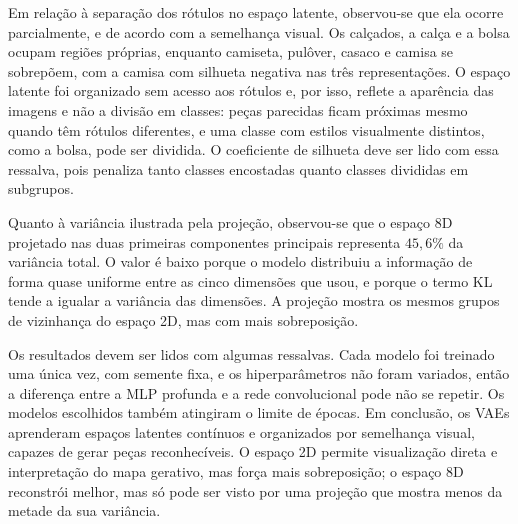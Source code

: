 \documentclass[11pt,a4paper]{article}
\begin{document}
Em relação à separação dos rótulos no espaço latente, observou-se que ela
ocorre parcialmente, e de acordo com a semelhança visual. Os calçados, a calça e a bolsa ocupam regiões próprias,
enquanto camiseta, pulôver, casaco e camisa se sobrepõem, com a camisa com
silhueta negativa nas três representações. O espaço latente foi organizado
sem acesso aos rótulos e, por isso, reflete a aparência das imagens e não a
divisão em classes: peças parecidas ficam próximas mesmo quando têm rótulos
diferentes, e uma classe com estilos visualmente distintos, como a bolsa, pode ser
dividida. O coeficiente de silhueta deve ser lido com essa ressalva, pois
penaliza tanto classes encostadas quanto classes divididas em subgrupos.
 
Quanto à variância ilustrada pela projeção, observou-se que o espaço 8D
projetado nas duas primeiras componentes principais representa $45{,}6\%$ da
variância total. O valor é baixo
porque o modelo distribuiu a informação de forma quase uniforme entre as cinco
dimensões que usou, e porque o termo KL tende a igualar a variância das
dimensões. A projeção mostra os mesmos grupos de vizinhança do espaço 2D, mas
com mais sobreposição.
 
Os resultados devem ser lidos com algumas ressalvas. Cada modelo foi treinado uma
única vez, com semente fixa, e os hiperparâmetros não foram variados, então a
diferença entre a MLP profunda e a rede convolucional pode não se repetir. Os
modelos escolhidos também atingiram o limite de épocas. Em conclusão, os VAEs
aprenderam espaços latentes contínuos e organizados por semelhança visual, capazes
de gerar peças reconhecíveis. O espaço 2D permite visualização direta e
interpretação do mapa gerativo, mas força mais sobreposição; o espaço 8D
reconstrói melhor, mas só pode ser visto por uma projeção que mostra menos da
metade da sua variância.

\end{document}
